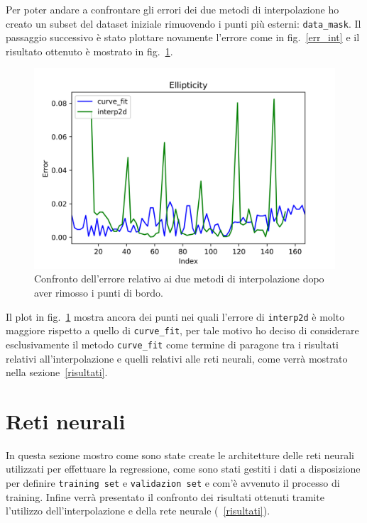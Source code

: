 \documentclass[12pt,a4paper,final]{book}
\begin{document}
Per poter andare a confrontare gli errori dei due metodi di interpolazione ho creato un subset del dataset iniziale rimuovendo i punti più esterni: \texttt{data\_mask}. Il passaggio successivo è stato plottare novamente l'errore come in fig.~\ref{err_int} e il risultato ottenuto è mostrato in fig.~\ref{err_int_mask}.

\begin{figure}[!ht]
	\centering
	\includegraphics[scale=0.8]{../figures/error_comparison.png}
	\caption{Confronto dell'errore relativo ai due metodi di interpolazione dopo aver rimosso i punti di bordo.}
	\label{err_int_mask}
\end{figure}

Il plot in fig.~\ref{err_int_mask} mostra ancora dei punti nei quali l'errore di \texttt{interp2d} è molto maggiore rispetto a quello di \texttt{curve\_fit}, per tale motivo ho deciso di considerare esclusivamente il metodo \texttt{curve\_fit} come termine di paragone tra i risultati relativi all'interpolazione e quelli relativi alle reti neurali, come verrà mostrato nella sezione~\ref{risultati}.


\section{Reti neurali}\label{reti_neurali}
In questa sezione mostro come sono state create le architetture delle reti neurali utilizzati per effettuare la regressione, come sono stati gestiti i dati a disposizione per definire \texttt{training set} e \texttt{validazion set} e com'è avvenuto il processo di training. Infine verrà presentato il confronto dei risultati ottenuti tramite l'utilizzo dell'interpolazione e della rete neurale (~\ref{risultati}).
\end{document}
